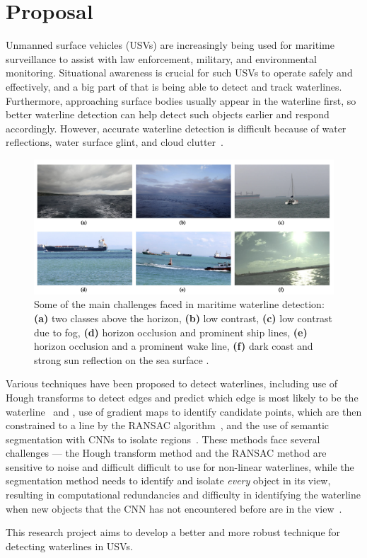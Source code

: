 \section*{Proposal}

Unmanned surface vehicles (USVs) are increasingly being used for maritime surveillance
to assist with law enforcement, military, and environmental monitoring.
Situational awareness is crucial for such USVs to operate safely and effectively,
and a big part of that is being able to detect and track waterlines.
Furthermore, approaching surface bodies usually appear in the waterline first,
so better waterline detection can help detect such objects earlier and
respond accordingly.
However, accurate waterline detection is difficult because of water reflections,
water surface glint, and cloud clutter~\cite{zhan-2017}.

\begin{figure}[h!]
  \includegraphics[width=\textwidth]{challenging-maritime-landscapes.png}
  \caption{
    Some of the main challenges faced in maritime waterline detection:
    \textbf{(a)} two classes above the horizon,
    \textbf{(b)} low contrast,
    \textbf{(c)} low contrast due to fog,
    \textbf{(d)} horizon occlusion and prominent ship lines,
    \textbf{(e)} horizon occlusion and a prominent wake line,
    \textbf{(f)} dark coast and strong sun reflection on the sea surface
    \cite{zardoua-2021}.
  }
\end{figure}
Various techniques have been proposed to detect waterlines,
including use of Hough transforms to detect edges and predict which edge
is most likely to be the waterline~\cite{gao-2007} and \cite{prasad-2017},
use of gradient maps to identify candidate points, which are then constrained
to a line by the \textsc{RANSAC} algorithm~\cite{zhan-2017},
and the use of semantic segmentation with CNNs to isolate regions~\cite{bovcon-2020}.
These methods face several challenges ---
the Hough transform method and the \textsc{RANSAC} method are sensitive to noise
and difficult difficult to use for non-linear waterlines,
while the segmentation method needs to identify and isolate
\emph{every} object in its view, resulting in computational redundancies
and difficulty in identifying the waterline when new objects that the CNN
has not encountered before are in the view~\cite{bovcon-2020}.

\step
This research project aims to develop a better and more robust technique for
detecting waterlines in USVs.
